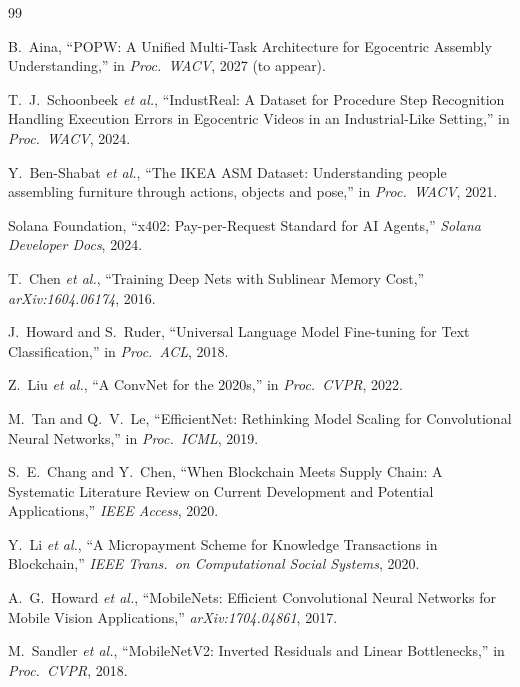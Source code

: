 \documentclass[10pt,twocolumn]{article}
\begin{document}
\begin{thebibliography}{99}

B.~Aina,
``POPW: A Unified Multi-Task Architecture for Egocentric Assembly Understanding,''
in \emph{Proc.\ WACV}, 2027 (to appear).

T.~J.~Schoonbeek \emph{et al.},
``IndustReal: A Dataset for Procedure Step Recognition Handling Execution Errors in Egocentric Videos in an Industrial-Like Setting,''
in \emph{Proc.\ WACV}, 2024.

Y.~Ben-Shabat \emph{et al.},
``The IKEA ASM Dataset: Understanding people assembling furniture through actions, objects and pose,''
in \emph{Proc.\ WACV}, 2021.

Solana Foundation,
``x402: Pay-per-Request Standard for AI Agents,''
\emph{Solana Developer Docs}, 2024.

T.~Chen \emph{et al.},
``Training Deep Nets with Sublinear Memory Cost,''
\emph{arXiv:1604.06174}, 2016.

J.~Howard and S.~Ruder,
``Universal Language Model Fine-tuning for Text Classification,''
in \emph{Proc.\ ACL}, 2018.

Z.~Liu \emph{et al.},
``A ConvNet for the 2020s,''
in \emph{Proc.\ CVPR}, 2022.

M.~Tan and Q.~V.~Le,
``EfficientNet: Rethinking Model Scaling for Convolutional Neural Networks,''
in \emph{Proc.\ ICML}, 2019.

S.~E.~Chang and Y.~Chen,
``When Blockchain Meets Supply Chain: A Systematic Literature Review on Current Development and Potential Applications,''
\emph{IEEE Access}, 2020.

Y.~Li \emph{et al.},
``A Micropayment Scheme for Knowledge Transactions in Blockchain,''
\emph{IEEE Trans.\ on Computational Social Systems}, 2020.

A.~G.~Howard \emph{et al.},
``MobileNets: Efficient Convolutional Neural Networks for Mobile Vision Applications,''
\emph{arXiv:1704.04861}, 2017.

M.~Sandler \emph{et al.},
``MobileNetV2: Inverted Residuals and Linear Bottlenecks,''
in \emph{Proc.\ CVPR}, 2018.


\end{thebibliography}
\end{document}
